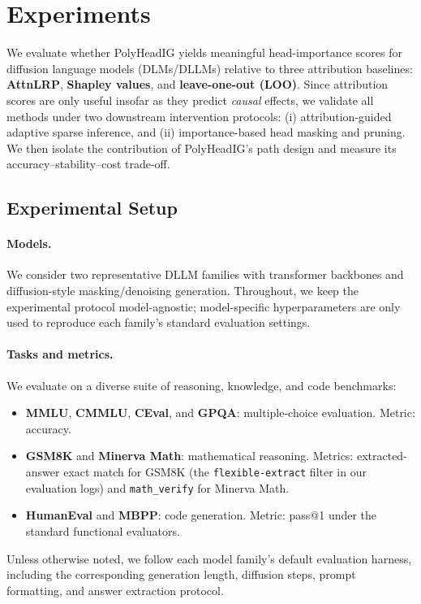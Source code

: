 \section{Experiments}
\label{sec:experiments}

We evaluate whether PolyHeadIG yields meaningful head-importance scores for diffusion language models (DLMs/DLLMs) relative to three attribution baselines: \textbf{AttnLRP}, \textbf{Shapley values}, and \textbf{leave-one-out (LOO)}. Since attribution scores are only useful insofar as they predict \emph{causal} effects, we validate all methods under two downstream intervention protocols: (i) attribution-guided adaptive sparse inference, and (ii) importance-based head masking and pruning. We then isolate the contribution of PolyHeadIG's path design and measure its accuracy--stability--cost trade-off.

\subsection{Experimental Setup}
\label{sec:exp:setup}

\paragraph{Models.}
We consider two representative DLLM families with transformer backbones and diffusion-style masking/denoising generation. Throughout, we keep the experimental protocol model-agnostic; model-specific hyperparameters are only used to reproduce each family’s standard evaluation settings.

\paragraph{Tasks and metrics.}
We evaluate on a diverse suite of reasoning, knowledge, and code benchmarks:
\begin{itemize}
    \item \textbf{MMLU}, \textbf{CMMLU}, \textbf{CEval}, and \textbf{GPQA}: multiple-choice evaluation. Metric: accuracy.
    \item \textbf{GSM8K} and \textbf{Minerva Math}: mathematical reasoning. Metrics: extracted-answer exact match for GSM8K (the \texttt{flexible-extract} filter in our evaluation logs) and \texttt{math\_verify} for Minerva Math.
    \item \textbf{HumanEval} and \textbf{MBPP}: code generation. Metric: pass@1 under the standard functional evaluators.
\end{itemize}
Unless otherwise noted, we follow each model family’s default evaluation harness, including the corresponding generation length, diffusion steps, prompt formatting, and answer extraction protocol.

